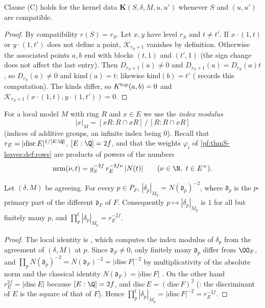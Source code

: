 \begin{lemma}\label{pf:thmS-leaves:lem:LMT}
Clause (C) holds for the kernel data $\mathbf K(S,\delta,M,u,u')$ whenever $S$ and $(u,u')$ are compatible.
\end{lemma}

\begin{proof}
By compatibility $r(S)=r_S$. Let $x,y$ have level $r_S$ and $t\ne t'$. If $x\cdot(1,t)$ or $y\cdot(1,t')$ does not define a point,
$\mathcal K_{r_S+1}$ vanishes by definition. Otherwise the associated points $a,b$ end with blocks $(t,1)$ and $(t',1)$ (the sign
change does not affect the last entry). Then $D_{r_S+1}(a)\ne0$ and $D_{r_S+1}(a)=D_{r_S}(a)t$, so $D_{r_S}(a)\ne0$ and
$\mathrm{kind}(a)=t$; likewise $\mathrm{kind}(b)=t'$ ( records this computation).
The kinds differ, so $K^{\mathrm{top}}(a,b)=0$ and $\mathcal K_{r_S+1}(x\cdot(1,t),y\cdot(1,t'))=0$.
\end{proof}

For a local model $M$ with ring $R$ and $x\in E$ we use the \emph{index modulus}
\[
|x|_M=[xR:R\cap xR]\,/\,[R:R\cap xR]
\]
(indices of additive groups, an infinite index being $0$). Recall that $r_E=|\mathrm{disc}\,E|^{1/[E:\Q]}$, $[E:\Q]=2f$, and that
the weights $\varphi_i$ of \cref{pf:thmS-leaves:def:rows} are products of powers of the numbers
\[
\mathrm{nrm}(\nu,t)=g_S^{-2f}\,r_E^{-2f\nu}\,|N(t)|\qquad(\nu\in\N,\ t\in E^\times).
\]

\begin{lemma}\label{pf:thmS-leaves:lem:deltaprod}
Let $(\delta,M)$ be agreeing. For every $p\in P_F$, $|\delta_p|_{M_p}=N(\mathfrak d_p)^{-2}$, where $\mathfrak d_p$ is the $p$-primary part of the
different $\mathfrak d_F$ of $F$. Consequently $p\mapsto|\delta_p|_{M_p}$ is $1$ for all but finitely many $p$, and
$\prod^{\mathrm f}_p|\delta_p|_{M_p}=r_E^{-2f}$.
\end{lemma}

\begin{proof}
The local identity is , which computes the index modulus of $\delta_p$ from the
agreement of $(\delta,M)$ at $p$. Since $\mathfrak d_F\ne0$, only finitely many $\mathfrak d_p$ differ from $\OO_F$, and
$\prod_pN(\mathfrak d_p)^{-2}=N(\mathfrak d_F)^{-2}=|\mathrm{disc}\,F|^{-2}$ by multiplicativity of the absolute norm and the
classical identity $N(\mathfrak d_F)=|\mathrm{disc}\,F|$ \cite[Ch.~III, \S2]{Neukirch1999}. On the other hand
$r_E^{2f}=|\mathrm{disc}\,E|$ because $[E:\Q]=2f$, and $\mathrm{disc}\,E=(\mathrm{disc}\,F)^2$
(: the discriminant of $E$ is the square of that of $F$). Hence
$\prod^{\mathrm f}_p|\delta_p|_{M_p}=|\mathrm{disc}\,F|^{-2}=r_E^{-2f}$.
\end{proof}

